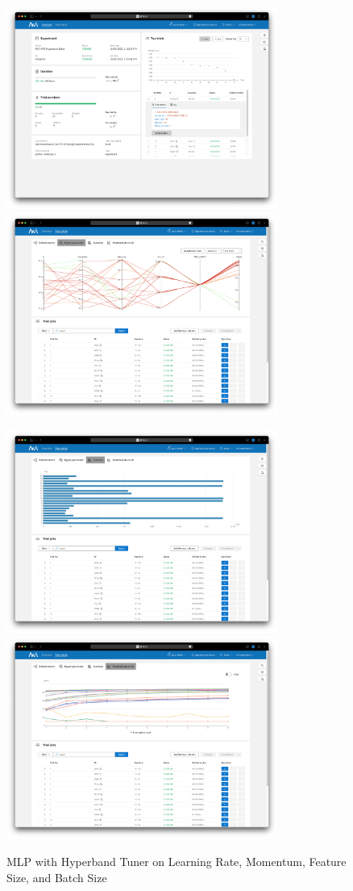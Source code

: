 \documentclass{article}
\begin{document}
\begin{figure}
    \centerline{\includegraphics[width=3.5in]{../proj3/figures/mlp_hyperband_batch_overview.png}\includegraphics[width=3.5in]{../proj3/figures/mlp_hyperband_batch_hyperparameter.png}}
    \centerline{\includegraphics[width=3.5in]{../proj3/figures/mlp_hyperband_batch_latency.png}\includegraphics[width=3.5in]{../proj3/figures/mlp_hyperband_batch_intermediate.png}}
    \caption{MLP with Hyperband Tuner on Learning Rate, Momentum, Feature Size, and Batch Size}
    \label{fig:mlp-hyperband-batch}
\end{figure}
\end{document}
